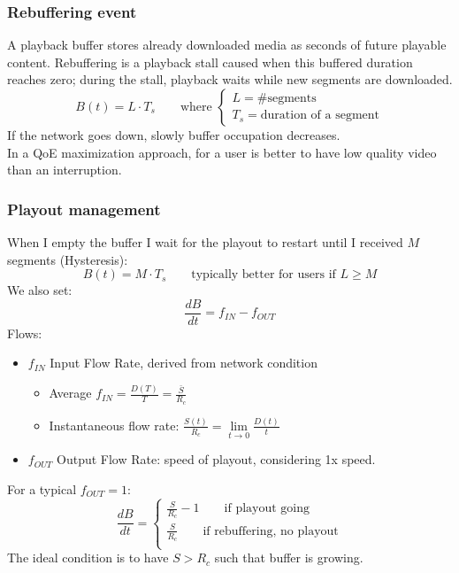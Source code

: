 \subsubsection{Rebuffering event}
A playback buffer stores already downloaded media as seconds of future playable content. Rebuffering is a playback stall caused when this buffered duration reaches zero; during the stall, playback waits while new segments are downloaded.
$$B(t) = L \cdot T_s \qquad \text{where }\begin{cases}
    L = \# \text{segments}\\
    T_s = \text{duration of a segment}
\end{cases}$$
If the network goes down, slowly buffer occupation decreases.\\
In a QoE maximization approach, for a user is better to have low quality video than an interruption.
\subsubsection{Playout management}
When I empty the buffer I wait for the playout to restart until I received $M$ segments (Hysteresis):
$$B(t) = M \cdot T_s \qquad \text{typically better for users if }L \geq M$$
We also set:
$$\frac{dB}{dt} = f_{IN} - f_{OUT}$$
Flows:
\begin{itemize}
    \item $f_{IN}$ Input Flow Rate, derived from network condition
        \begin{itemize}
            \item Average $f_{IN} = \frac{D(T)}{T} = \frac{\bar{S}}{R_c}$
            \item Instantaneous flow rate: $\frac{S(t)}{R_c} = \lim\limits_{t\to 0}\frac{D(t)}{t}$
        \end{itemize} 
        \item $f_{OUT}$ Output Flow Rate: speed of playout, considering 1x speed.
\end{itemize}
For a typical $f_{OUT} = 1$: $$\frac{dB}{dt} = \begin{cases}
            \frac{S}{R_c} - 1 \qquad \text{if playout going}\\
            \frac{S}{R_c} \qquad \text{if rebuffering, no playout}\\
        \end{cases}$$
The ideal condition is to have $S > R_c$ such that buffer is growing.\\
